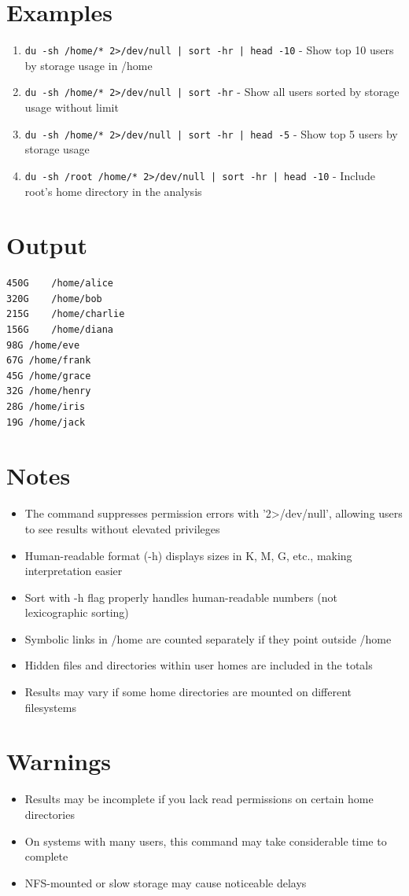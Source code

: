 \documentclass{article}
\begin{document}
\section*{Examples}
\begin{enumerate}
  \item \texttt{du -sh /home/* 2>/dev/null | sort -hr | head -10} - Show top 10 users by storage usage in /home
  \item \texttt{du -sh /home/* 2>/dev/null | sort -hr} - Show all users sorted by storage usage without limit
  \item \texttt{du -sh /home/* 2>/dev/null | sort -hr | head -5} - Show top 5 users by storage usage
  \item \texttt{du -sh /root /home/* 2>/dev/null | sort -hr | head -10} - Include root's home directory in the analysis
\end{enumerate}

\section*{Output}
\begin{lstlisting}
450G	/home/alice
320G	/home/bob
215G	/home/charlie
156G	/home/diana
98G	/home/eve
67G	/home/frank
45G	/home/grace
32G	/home/henry
28G	/home/iris
19G	/home/jack
\end{lstlisting}

\section*{Notes}
\begin{itemize}
  \item The command suppresses permission errors with '2>/dev/null', allowing users to see results without elevated privileges
  \item Human-readable format (-h) displays sizes in K, M, G, etc., making interpretation easier
  \item Sort with -h flag properly handles human-readable numbers (not lexicographic sorting)
  \item Symbolic links in /home are counted separately if they point outside /home
  \item Hidden files and directories within user homes are included in the totals
  \item Results may vary if some home directories are mounted on different filesystems
\end{itemize}

\section*{Warnings}
\begin{itemize}
  \item Results may be incomplete if you lack read permissions on certain home directories
  \item On systems with many users, this command may take considerable time to complete
  \item NFS-mounted or slow storage may cause noticeable delays
\end{itemize}
\end{document}
